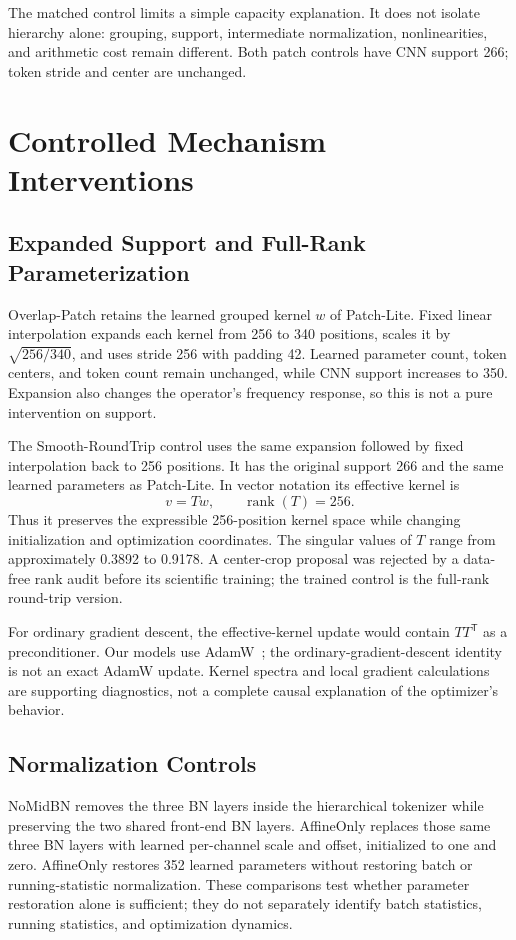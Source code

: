 \documentclass[journal]{IEEEtran}
\begin{document}
The matched control limits a simple capacity explanation. It does not isolate hierarchy alone: grouping, support, intermediate normalization, nonlinearities, and arithmetic cost remain different. Both patch controls have CNN support 266; token stride and center are unchanged.

\section{Controlled Mechanism Interventions}
\subsection{Expanded Support and Full-Rank Parameterization}
Overlap-Patch retains the learned grouped kernel $w$ of Patch-Lite. Fixed linear interpolation expands each kernel from 256 to 340 positions, scales it by $\sqrt{256/340}$, and uses stride 256 with padding 42. Learned parameter count, token centers, and token count remain unchanged, while CNN support increases to 350. Expansion also changes the operator's frequency response, so this is not a pure intervention on support.

The Smooth-RoundTrip control uses the same expansion followed by fixed interpolation back to 256 positions. It has the original support 266 and the same learned parameters as Patch-Lite. In vector notation its effective kernel is
\begin{equation}
v=T w,\qquad \operatorname{rank}(T)=256.
\label{eq:parameterization}
\end{equation}
Thus it preserves the expressible 256-position kernel space while changing initialization and optimization coordinates. The singular values of $T$ range from approximately 0.3892 to 0.9178. A center-crop proposal was rejected by a data-free rank audit before its scientific training; the trained control is the full-rank round-trip version.

For ordinary gradient descent, the effective-kernel update would contain $TT^{\mathsf T}$ as a preconditioner. Our models use AdamW~\cite{adamw2019}; the ordinary-gradient-descent identity is not an exact AdamW update. Kernel spectra and local gradient calculations are supporting diagnostics, not a complete causal explanation of the optimizer's behavior.

\subsection{Normalization Controls}
NoMidBN removes the three BN layers inside the hierarchical tokenizer while preserving the two shared front-end BN layers. AffineOnly replaces those same three BN layers with learned per-channel scale and offset, initialized to one and zero. AffineOnly restores 352 learned parameters without restoring batch or running-statistic normalization. These comparisons test whether parameter restoration alone is sufficient; they do not separately identify batch statistics, running statistics, and optimization dynamics.
\end{document}
